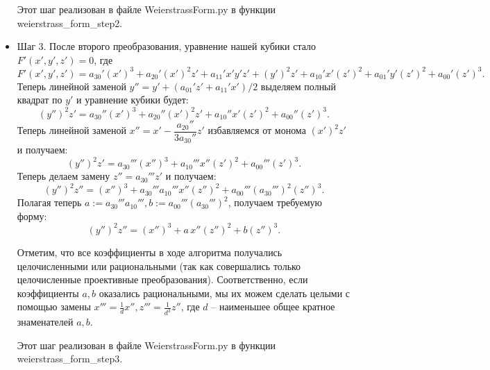 \begin{itemize}[leftmargin=0.6cm]
    Этот шаг реализован в файле \textsf{WeierstrassForm.py} в функции
    \textsf{weierstrass\_form\_step2}.

    \item Шаг 3. После второго преобразования, уравнение нашей кубики стало \(F'(x',
    y', z') = 0\), где 
    \[
    F'(x', y', z') = a_{30}' \left( x' \right)^3 + a_{20}' \left( x' \right)^2
    z' + a_{11}' x' y' z' + \left( y' \right)^2 z' + a_{10}' x' \left(
    z' \right)^2 + a_{01}' y' \left( z' \right)^2 + a_{00}' \left( z'
    \right)^3
    .\] 
    Теперь линейной заменой \(y'' =  y' + (a_{01}' z' + a_{11}' x')/2\) выделяем полный
    квадрат по \(y'\) и уравнение кубики будет:
    \[
    \left( y'' \right)^2 z' = a_{30}'' \left( x' \right)^3 + a_{20}'' \left( x' \right)^2
    z' + a_{10}'' x' \left( z' \right)^2 + a_{00}'' \left( z' \right)^3
    .\] 
    Теперь линейной заменой \(x'' = x' - \dfrac{a_{20}''}{3 a_{30}''} z'\)
    избавляемся от монома \(\left( x' \right)^2 z'\) и получаем:
    \[
    \left( y'' \right)^2 z' = a_{30}''' \left( x'' \right)^3 + a_{10}''' x''
    \left( z' \right)^2 + a_{00}''' \left( z' \right)^3
    .\] 
    Теперь делаем замену \(z'' = a_{30}''' z'\) и получаем:
    \[
    \left( y'' \right)^2 z'' = \left( x'' \right)^3 + a_{30}''' a_{10}''' x''
    \left( z'' \right)^2 + a_{00}''' \left( a_{30}''' \right)^2 \left( z'' \right)^3
    .\] 
    Полагая теперь \(a := a_{30}''' a_{10}''', b := a_{00}''' \left( a_{30}'''
    \right)^2\), получаем требуемую форму: 
    \[
    \left( y'' \right)^2 z'' = \left( x'' \right)^3 + a \, x''
    \left( z'' \right)^2 + b \left( z'' \right)^3
    .\] 

    \begin{remark*}
        Отметим, что все коэффициенты в ходе алгоритма получались
        целочисленными или рациональными (так как совершались только
        целочисленные проективные преобразования). Соответственно, если
        коэффициенты \(a, b\) оказались рациональными, мы их можем сделать
        целыми с помощью замены \(x''' = \frac{1}{d} x'', z''' = \frac{1}{d^3}
        z''\), где \(d\) -- наименьшее общее кратное знаменателей \(a, b\).
    \end{remark*}

    Этот шаг реализован в файле \textsf{WeierstrassForm.py} в функции
    \textsf{weierstrass\_form\_step3}.
\end{itemize}


\bigskip
\bigskip
